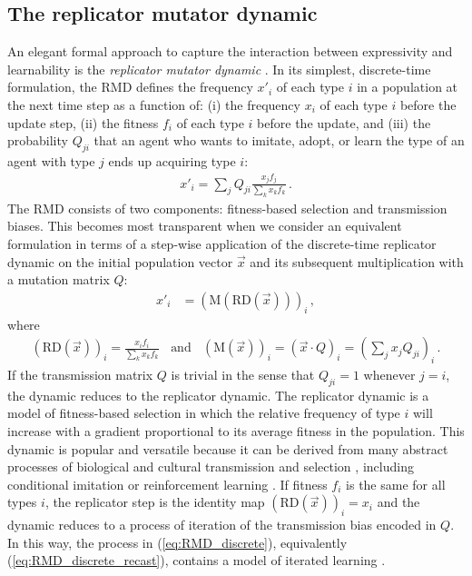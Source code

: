 \documentclass[a4paper, 11pt]{article}
\theoremstyle{Satz}
\begin{document}
\subsection{The replicator mutator dynamic}

An elegant formal approach to capture the interaction between expressivity and learnability is
the \emph{replicator mutator dynamic}
\citep{Hofbauer1985:The-Selection-M,nowak+etal:2000,NowakKomarova2001:Evolution-of-Un,hofbauer+sigmund:2003,Nowak2006:Evolutionary-Dy}. In
its simplest, discrete-time formulation, the RMD defines the frequency $x'_i$ of each type $i$
in a population at the next time step as a function of: (i) the frequency $x_i$ of each type
$i$ before the update step, (ii) the fitness $f_i$ of each type $i$ before the update, and
(iii) the probability $Q_{ji}$ that an agent who wants to imitate, adopt, or learn the type of
an agent with type $j$ ends up acquiring type $i$:
\begin{align}
  \label{eq:RMD_discrete}
  x'_i = \sum_j Q_{ji} \frac{x_jf_j}{\sum_k x_k f_k}\,.
\end{align}
The RMD consists of two components: fitness-based selection and transmission biases. This
becomes most transparent when we consider an equivalent formulation in terms of a step-wise
application of the discrete-time replicator dynamic \citep{TaylorJonker1978:Evolutionary-St} on the initial population vector $\vec{x}$
and its subsequent multiplication with a mutation matrix $Q$:
\begin{align}
  \label{eq:RMD_discrete_recast}
  x'_i & = (\text{M}(\text{RD}(\vec{x})))_i\,,
\end{align}
where
\begin{align*}
      \left ( \text{RD}(\vec{x}) \right )_i 
         = \frac{x_i f_i}{\sum_k x_k f_k}
 \ \ \ \ \text{and} \ \ \ \ 
  (\text{M}(\vec{x}))_i = (\vec{x} \cdot Q)_i = \left ( \sum_j
          x_j Q_{ji} \right)_i\,.
\end{align*}
If the transmission matrix $Q$ is trivial in the sense that $Q_{ji}=1$ whenever $j=i$, the
dynamic reduces to the replicator dynamic. The replicator dynamic is a model of fitness-based
selection in which the relative frequency of type $i$ will increase with a gradient
proportional to its average fitness in the population. This dynamic is popular and
versatile because it can be derived from many abstract processes of biological and cultural
transmission and selection \citep[for overview and several derivations
see][]{Sandholm2010:Population-Game}, including conditional imitation
\citep[e.g.,][]{Helbing1996:A-Stochastic-Be,Schlag1998:Why-Imitate-and} or reinforcement
learning \citep[e.g.,][]{BorgersSarin997:Learning-Throug,Beggs2005:On-the-Converge}. If fitness
$f_i$ is the same for all types $i$, the replicator step is the identity map
$ \left ( \text{RD}(\vec{x}) \right )_i = x_i$ and the dynamic reduces to a process of
iteration of the transmission bias encoded in $Q$. In this way, the process in
(\ref{eq:RMD_discrete}), equivalently (\ref{eq:RMD_discrete_recast}), contains a model of
iterated learning \citep{griffiths+kalish:2007}. 
\end{document}
